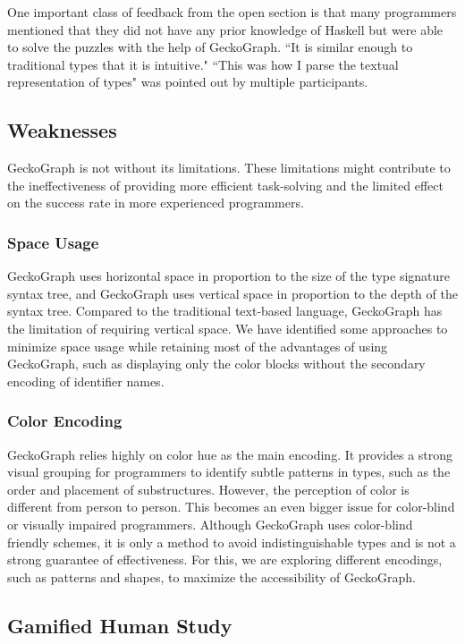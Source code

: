 One important class of feedback from the open section is that many programmers mentioned that they did not have any prior knowledge of Haskell but were able to solve the puzzles with the help of GeckoGraph.
``It is similar enough to traditional types that it is intuitive." ``This was how I parse the textual representation of types" was pointed out by multiple participants.

\subsection{Weaknesses}
GeckoGraph is not without its limitations. These limitations might contribute to the ineffectiveness of providing more efficient task-solving and the limited effect on the success rate in more experienced programmers. 

\subsubsection{Space Usage}\label{subsec:space}
GeckoGraph uses horizontal space in proportion to the size of the type signature syntax tree, and GeckoGraph uses vertical space in proportion to the depth of the syntax tree. Compared to the traditional text-based language, GeckoGraph has the limitation of requiring vertical space. We have identified some approaches to minimize space usage while retaining most of the advantages of using GeckoGraph, such as displaying only the color blocks without the secondary encoding of identifier names.


\subsubsection{Color Encoding}
GeckoGraph relies highly on color hue as the main encoding. It provides a strong visual grouping  \cite{Zeng2023-jz}  for programmers to identify subtle patterns in types, such as the order and placement of substructures. However, the perception of color is different from person to person. This becomes an even bigger issue for color-blind or visually impaired programmers. Although GeckoGraph uses color-blind friendly schemes, it is only a method to avoid indistinguishable types and is not a strong guarantee of effectiveness. For this, we are exploring different encodings, such as patterns and shapes, to maximize the accessibility of GeckoGraph. 


\subsection{Gamified Human Study}

